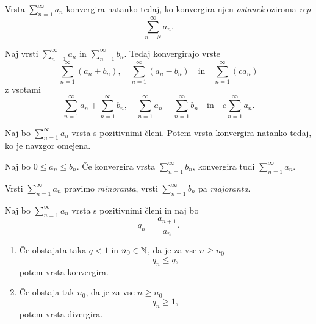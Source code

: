 \documentclass[12pt, a4paper]{article}
\begin{document}
\obvs

\begin{opomba}
Vrsta $\displaystyle\sum_{n=1}^\infty a_n$ konvergira natanko tedaj, ko konvergira njen \emph{ostanek} oziroma \emph{rep}
\[
\sum_{n=N}^\infty a_n.
\]
\end{opomba}

\begin{trditev}
Naj vrsti $\displaystyle\sum_{n=1}^\infty a_n$ in $\displaystyle\sum_{n=1}^\infty b_n$. Tedaj konvergirajo vrste
\[
\sum_{n=1}^\infty (a_n+b_n),\quad \sum_{n=1}^\infty (a_n-b_n)\quad\text{in}\quad \sum_{n=1}^\infty(ca_n)
\]
z vsotami
\[
\sum_{n=1}^\infty a_n+\sum_{n=1}^\infty b_n,\quad \sum_{n=1}^\infty a_n-\sum_{n=1}^\infty b_n\quad\text{in}\quad c\sum_{n=1}^\infty a_n.
\]
\end{trditev}

\obvs

\begin{trditev}
Naj bo $\displaystyle\sum_{n=1}^\infty a_n$ vrsta s pozitivnimi členi. Potem vrsta konvergira natanko tedaj, ko je navzgor omejena.
\end{trditev}

\obvs

\begin{trditev}
Naj bo $0\leq a_n\leq b_n$. Če konvergira vrsta $\displaystyle\sum_{n=1}^\infty b_n$, konvergira tudi $\displaystyle\sum_{n=1}^\infty a_n$.
\end{trditev}

\obvs

\begin{opomba}
Vrsti $\displaystyle\sum_{n=1}^\infty a_n$ pravimo \emph{minoranta}, vrsti $\displaystyle\sum_{n=1}^\infty b_n$ pa \emph{majoranta}.
\end{opomba}

\begin{izrek}
Naj bo $\displaystyle\sum_{n=1}^\infty a_n$ vrsta s pozitivnimi členi in naj bo
\[
q_n=\frac{a_{n+1}}{a_n}.
\]

\begin{enumerate}[label=\arabic*)]
\item Če obstajata taka $q<1$ in $n_0\in\mathbb{N}$, da je za vse $n\geq n_0$
\[
q_n\leq q,
\]
potem vrsta konvergira.
\item Če obstaja tak $n_0$, da je za vse $n\geq n_0$
\[
q_n\geq 1,
\]
potem vrsta divergira.
\end{enumerate}
\end{izrek}
\end{document}
